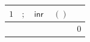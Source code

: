 {\scriptsize\setlength{\tabcolsep}{1.5pt}%
\begin{tabular}{cccc|l}
$\text{1}$ & $;$ & $\mathsf{inr}\,$ & $()$ & \\ \hline
\gcell{$$} & \gcell{$$} & \gcell{$\posC{\circ}$} & \gcell{$$} & $\text{0}$ \\
\end{tabular}}
